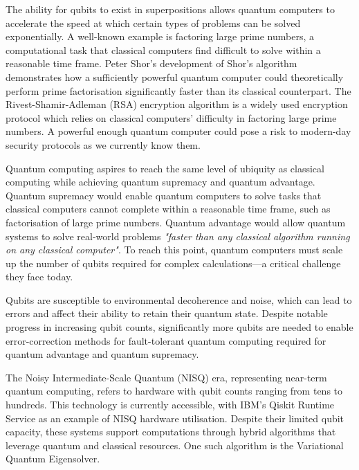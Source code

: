 \documentclass{article}
\begin{document}
{The ability for qubits to exist in superpositions allows quantum computers to accelerate the speed at which certain types of problems can be solved exponentially\cite{knowledgeacademy}. A well-known example is factoring large prime numbers, a computational task that classical computers find difficult to solve within a reasonable time frame. Peter Shor’s development of Shor’s algorithm demonstrates how a sufficiently powerful quantum computer could theoretically perform prime factorisation significantly faster than its classical counterpart\cite{Shor_1997}\cite{minutephysics}. The Rivest-Shamir-Adleman (RSA) encryption algorithm is a widely used encryption protocol which relies on classical computers' difficulty in factoring large prime numbers\cite{encryptionconsulting}. A powerful enough quantum computer could pose a risk to modern-day security protocols as we currently know them. 

Quantum computing aspires to reach the same level of ubiquity as classical computing while achieving quantum supremacy and quantum advantage. Quantum supremacy would enable quantum computers to solve tasks that classical computers cannot complete within a reasonable time frame, such as factorisation of large prime numbers\cite{quera}. Quantum advantage would allow quantum systems to solve real-world problems \textit{"faster than any classical algorithm running on any classical computer"}\cite{quera}. To reach this point, quantum computers must scale up the number of qubits required for complex calculations—a critical challenge they face today.

Qubits are susceptible to environmental decoherence and noise, which can lead to errors and affect their ability to retain their quantum state\cite{futurumcareers}. Despite notable progress in increasing qubit counts, significantly more qubits are needed to enable error-correction methods for fault-tolerant quantum computing required for quantum advantage and quantum supremacy\cite{NewScientist}.

The Noisy Intermediate-Scale Quantum (NISQ) era, representing near-term quantum computing, refers to hardware with qubit counts ranging from tens to hundreds\cite{NISQ}. This technology is currently accessible, with IBM's Qiskit Runtime Service as an example of NISQ hardware utilisation\cite{ReleaseSummary}. Despite their limited qubit capacity, these systems support computations through hybrid algorithms that leverage quantum and classical resources. One such algorithm is the Variational Quantum Eigensolver.

}
\end{document}
